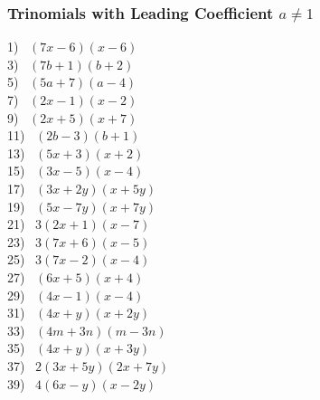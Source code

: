 \documentclass[11pt]{book}
\newcommand{\tmstrong}[1]{\textbf{#1}}
\theoremstyle{definition}  %
\begin{document}

\subsubsection{Trinomials with Leading Coefficient $a\neq 1$}

\begin{multicols}{2}
  1)~ $(7x-6)(x-6)$\\
  3)~ $(7b+1)(b+2)$\\
  5)~ $(5a+7)(a-4)$\\
  7)~ $(2x-1)(x-2)$\\
  9)~ $(2x+5)(x+7)$\\
  11)~ $(2b-3)(b+1)$\\
  13)~ $(5x+3)(x+2)$\\
  15)~ $(3x-5)(x-4)$\\
  17)~ $(3x+2y)(x+5y)$\\
  19)~ $(5x-7y)(x+7y)$\\
  21)~ $3(2x+1)(x-7)$\\
  23)~ $3(7x+6)(x-5)$\\
  25)~ $3(7x-2)(x-4)$\\
  27)~ $(6x+5)(x+4)$\\
  29)~ $(4x-1)(x-4)$\\
  31)~ $(4x+y)(x+2y)$\\
  33)~ $(4m+3n)(m-3n)$\\
  35)~ $(4x+y)(x+3y)$\\
  37)~ $2(3x+5y)(2x+7y)$\\
  39)~ $4(6x-y)(x-2y)$%
\end{multicols}
\end{document}
